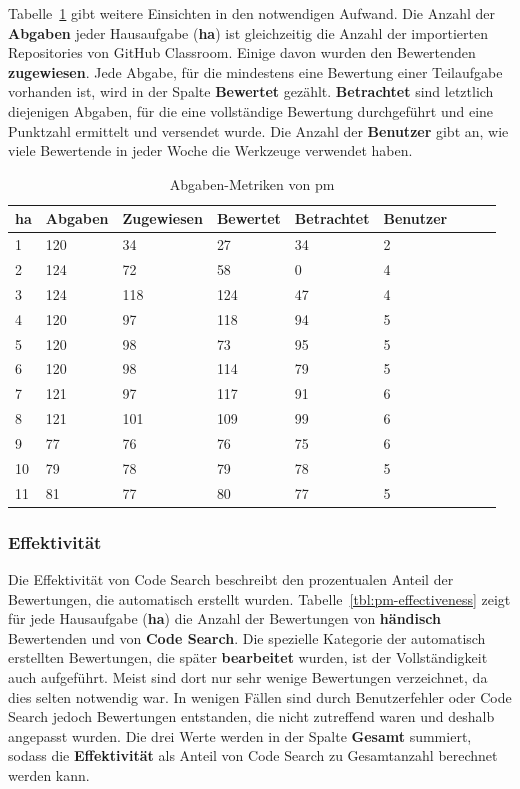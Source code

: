 \renewcommand{\thefootnote}{\arabic{footnote}}

Tabelle~\ref{tbl:pm-solutions} gibt weitere Einsichten in den notwendigen Aufwand.
Die Anzahl der \textbf{Abgaben} jeder Hausaufgabe (\textbf{\acs{ha}}) ist gleichzeitig die Anzahl der importierten Repositories von GitHub Classroom.
Einige davon wurden den Bewertenden \textbf{zugewiesen}.
Jede Abgabe, für die mindestens eine Bewertung einer Teilaufgabe vorhanden ist, wird in der Spalte \textbf{Bewertet} gezählt.
\textbf{Betrachtet} sind letztlich diejenigen Abgaben, für die eine vollständige Bewertung durchgeführt und eine Punktzahl ermittelt und versendet wurde.
Die Anzahl der \textbf{Benutzer} gibt an, wie viele Bewertende in jeder Woche die Werkzeuge verwendet haben.

\begin{table}
    \centering
    \caption{Abgaben-Metriken von \ac{pm}}
    \begin{tabular}{|l|l|l|l|l|l|l|l|l|}
    \hline
        \acs{ha} & Abgaben & Zugewiesen & Bewertet & Betrachtet & Benutzer \\ \hline
        1  & 120 &  34 &  27 & 34 & 2  \\ \hline
        2  & 124 &  72 &  58 &  0 & 4  \\ \hline
        3  & 124 & 118 & 124 & 47 & 4  \\ \hline
        4  & 120 &  97 & 118 & 94 & 5  \\ \hline
        5  & 120 &  98 &  73 & 95 & 5  \\ \hline
        6  & 120 &  98 & 114 & 79 & 5  \\ \hline
        7  & 121 &  97 & 117 & 91 & 6  \\ \hline
        8  & 121 & 101 & 109 & 99 & 6  \\ \hline
        9  &  77 &  76 &  76 & 75 & 6  \\ \hline
        10 &  79 &  78 &  79 & 78 & 5  \\ \hline
        11 &  81 &  77 &  80 & 77 & 5  \\ \hline
    \end{tabular}
    \label{tbl:pm-solutions}
\end{table}

\subsubsection{Effektivität}

Die Effektivität von Code Search beschreibt den prozentualen Anteil der Bewertungen, die automatisch erstellt wurden.
Tabelle~\ref{tbl:pm-effectiveness} zeigt für jede Hausaufgabe (\textbf{\acs{ha}}) die Anzahl der Bewertungen von \textbf{händisch} Bewertenden und von \textbf{Code Search}.
Die spezielle Kategorie der automatisch erstellten Bewertungen, die später \textbf{bearbeitet} wurden, ist der Vollständigkeit auch aufgeführt.
Meist sind dort nur sehr wenige Bewertungen verzeichnet, da dies selten notwendig war.
In wenigen Fällen sind durch Benutzerfehler oder Code Search jedoch Bewertungen entstanden, die nicht zutreffend waren und deshalb angepasst wurden.
Die drei Werte werden in der Spalte \textbf{Gesamt} summiert, sodass die \textbf{Effektivität} als Anteil von Code Search zu Gesamtanzahl berechnet werden kann.

